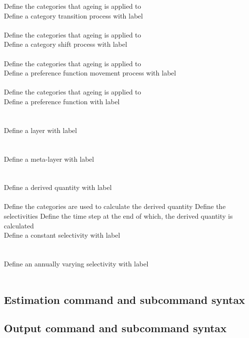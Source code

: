  {Define the categories that ageing is applied to}
\\  {Define a category transition process with label}\\ \\
 {Define the categories that ageing is applied to}
\\  {Define a category shift process with label}\\ \\
 {Define the categories that ageing is applied to}
\\  {Define a preference function movement process with label}\\ \\
 {Define the categories that ageing is applied to}
\\  {Define a preference function with label}\\ \\
\\  {Define a layer with label}\\ \\
\\  {Define a meta-layer with label}\\ \\
\\  {Define a derived quantity with label}\\ \\
 {Define the categories are used to calculate the derived quantity}
 {Define the selectivities}
 {Define the time step at the end of which, the derived quantity is calculated}
\\  {Define a constant selectivity with label}\\ \\
\\  {Define an annually varying selectivity with label}\\ \\
\subsection*{Estimation command and subcommand syntax}
\subsection*{Output command and subcommand syntax}
